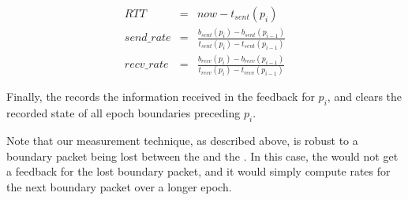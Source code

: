 
\begin{subequations}
    \begin{align}
        RTT &= &now -  t_{sent}(p_i)\\
        send\_rate &= &\frac{b_{sent}(p_i) - b_{sent}(p_{i-1})}{t_{sent}(p_i)-t_{sent}(p_{i-1})}\\
        recv\_rate &= &\frac{b_{recv}(p_i) - b_{recv}(p_{i-1})}{t_{recv}(p_i)-t_{recv}(p_{i-1})}
    \end{align}
\end{subequations}

Finally, the \inbox records the information received in the feedback for $p_i$, and clears the recorded state of all epoch boundaries preceding $p_i$.


Note that our measurement technique, as described above, is robust to a boundary packet being lost between the \inbox and the \outbox. In this case, the \inbox would not get a feedback for the lost boundary packet, and it would simply compute rates for the next boundary packet over a longer epoch. 


